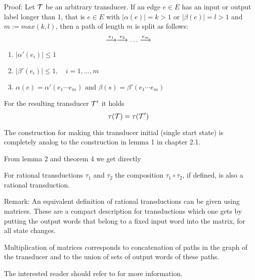 Proof: Let $\mbox{$\mathcal{T}$}$ be an arbitrary transducer. If an edge $e \in E$ has an
input or output label longer than 1, that is $e \in E$ with $|\alpha(e)| = k >
1$ or $|\beta(e)| = l > 1$ and $m := max(k, l)$, then a path of length $m$ is
split as follows:
\[ \stackrel{e_1}{\longrightarrow} \stackrel{e_2}{\longrightarrow} \ldots \stackrel{e_m}{\longrightarrow} \]

\begin{enumerate}
  \item $|\alpha'(e_i)| \leq 1$
  \item $|\beta'(e_i)| \leq 1,\quad i = 1,\ldots,m$
  \item $\alpha(e) = \alpha'(e_1 \cdots e_m)$ and $\beta(s) = \beta'(e_1
  \cdots e_m)$
\end{enumerate}

For the resulting transducer $\mbox{$\mathcal{T'}$}$ it holds \[ \tau(\mbox{$\mathcal{T}$}) = \tau(\mbox{$\mathcal{T}$}')
\]

The construction for making this transducer initial (single start state) is
completely analog to the construction in lemma 1 in chapter 2.1.

From lemma 2 and theorem 4 we get directly

\begin{theorem} For rational transductions $\tau_1$ and $\tau_2$ the composition $\tau_1 \circ
\tau_2$, if defined, is also a rational transduction.
\end{theorem}

Remark: An equivalent definition of rational transductions can be given using
matrices. These are a compact description for transductions which one gets by
putting the output words that belong to a fixed input word into the matrix, for
all state changes.

Multiplication of matrices corresponds to concatenation of paths in the graph of
the transducer and to the union of sets of output words of these paths.

The interested reader should refer to \cite{Be} for more information.

















